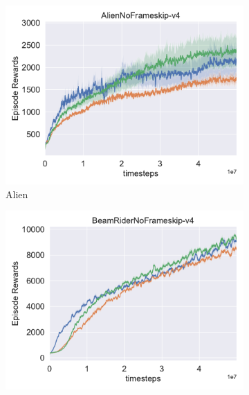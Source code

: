 \begin{figure}[h!]
\centering
  \begin{subfigure}[t]{0.49\textwidth}
    \includegraphics[width=\textwidth]{figures/chapter5/atari_exp/alien.pdf}
    \caption{Alien}
  \end{subfigure}\hfill
  \begin{subfigure}[t]{0.49\textwidth}
    \includegraphics[width=\textwidth]{figures/chapter5/atari_exp/beamrider.pdf}

\end{subfigure}
\end{figure}
